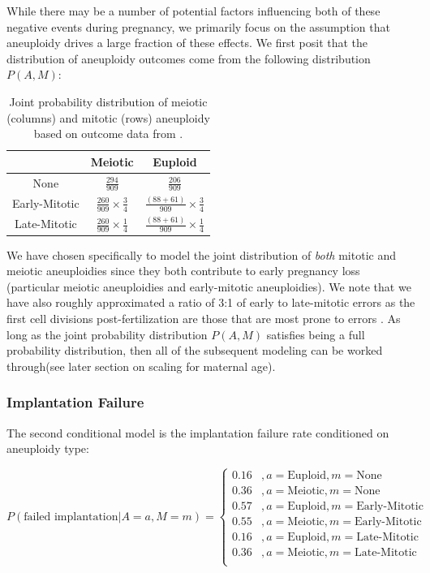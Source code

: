 \documentclass{article}
\begin{document}
While there may be a number of potential factors influencing both of these negative events during pregnancy, we primarily focus on the assumption that aneuploidy drives a large fraction of these effects. We first posit that the distribution of aneuploidy outcomes come from the following distribution $P(A,M)$: 

\begin{table}[H]
\begin{center}
	\begin{tabular}{ |c|c|c| } 
	 \hline
	  & Meiotic & Euploid  \\ 
	 \hline
	 None & $\frac{294}{909}$ & $\frac{206}{909}$ \\ 
	 \hline
	 Early-Mitotic & $\frac{260}{909}\times \frac{3}{4}$ & $\frac{(88 + 61)}{909}\times \frac{3}{4}$ \\
	 \hline
	 Late-Mitotic & $\frac{260}{909}\times \frac{1}{4}$ & $\frac{(88 + 61)}{909}\times \frac{1}{4}$\\
	 \hline
	\end{tabular}
	\caption{Joint probability distribution of meiotic (columns) and mitotic (rows) aneuploidy based on outcome data from \citep{McCoy2023-dg}.}
	\label{table:1}
	\end{center}
\end{table}

We have chosen specifically to model the joint distribution of \textit{both} mitotic and meiotic aneuploidies since they both contribute to early pregnancy loss (particular meiotic aneuploidies and early-mitotic aneuploidies). We note that we have also roughly approximated a ratio of 3:1 of early to late-mitotic errors as the first cell divisions post-fertilization are those that are most prone to errors \citep{Currie2022-wp}. As long as the joint probability distribution $P(A,M)$ satisfies being a full probability distribution, then all of the subsequent modeling can be worked through(see later section on scaling for maternal age). 

\subsubsection*{Implantation Failure}

The second conditional model is the implantation failure rate conditioned on aneuploidy type: 

\begin{equation}
P(\text{failed implantation} | A=a, M=m) = \begin{cases}
0.16 &, a = \text{Euploid}, m = \text{None}\\
0.36 &, a = \text{Meiotic}, m = \text{None}\\
0.57 &, a = \text{Euploid}, m = \text{Early-Mitotic}\\
0.55 &, a = \text{Meiotic}, m = \text{Early-Mitotic}\\
0.16 &, a = \text{Euploid}, m = \text{Late-Mitotic}\\
0.36 &, a = \text{Meiotic}, m = \text{Late-Mitotic}\\
\end{cases}
\end{equation}
\end{document}
